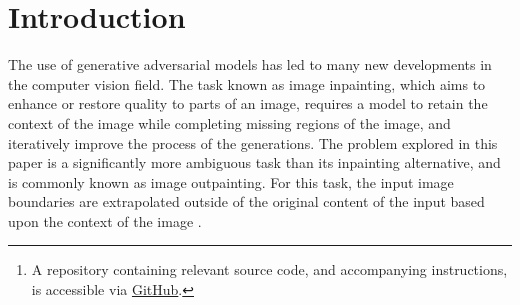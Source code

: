\documentclass{article}
\begin{document}
\begin{abstract} 
Although humans perform well at predicting what exists beyond the boundaries of an image, deep models struggle to understand context and extrapolation through retained information. This task is known as image outpainting and involves generating realistic expansions of an image’s boundaries. Current models use generative adversarial networks to generate results which lack localized image feature consistency and appear fake. We propose two methods to improve this issue: the use of a local and global discriminator, and the addition of residual blocks within the encoding section of the network. Comparisons of our model and the baseline’s L1 loss, mean squared error (MSE) loss, and qualitative differences reveal our model is able to naturally extend object boundaries and produce more internally consistent images compared to current methods but produces lower fidelity images.\footnote[2]{A repository containing relevant source code, and accompanying instructions, is accessible via \href{https://github.com/etarthur/Outpainting}{GitHub}.}
\end{abstract} 

\section{Introduction}
The use of generative adversarial models has led to many new developments in the computer vision field. The task known as image inpainting, which aims to enhance or restore quality to parts of an image, requires a model to retain the context of the image while completing missing regions of the image, and iteratively improve the process of the generations. The problem explored in this paper is a significantly more ambiguous task than its inpainting alternative, and is commonly known as image outpainting. For this task, the input image boundaries are extrapolated outside of the original content of the input based upon the context of the image \citep{sabini_painting_2018}.
\end{document}
